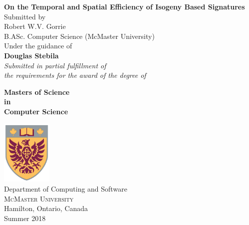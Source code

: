 \begin{titlepage}

\begin{center}
\Large \textbf {On the Temporal and Spatial Efficiency of Isogeny Based Signatures}\\[1in]

\normalsize Submitted by \\[0.25in]

Robert W.V. Gorrie \\
B.ASc. Computer Science (McMaster University)\\

\vspace{.6in}
Under the guidance of\\
{\textbf{Douglas Stebila}}\\[0.6in]

\small \emph{Submitted in partial fulfillment of\\
        the requirements for the award of the degree of}
        \vspace{.2in}

       {\bf Masters of Science \\in\\ Computer Science}\\[0.5in]

\vfill

\includegraphics[width=0.18\textwidth]{cresticon}\\[0.1in]
\Large{Department of Computing and Software}\\
\normalsize
\textsc{McMaster University}\\
Hamilton, Ontario, Canada\\
\vspace{0.2cm}
Summer 2018

\end{center}

\end{titlepage}
